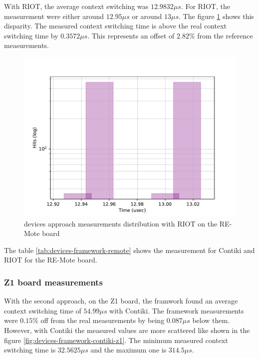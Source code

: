 With RIOT, the average context switching was $12.9832\mu s$.
For RIOT, the measurement were either around $12.95 \mu s$ or around $13 \mu s$.
The figure \ref{fig:devices-framework-riot-remote} shows this disparity.
The measured context switching time is above the real context switching time by $0.3572\mu s$.
This represents an offset of $2.82\%$ from the reference measurements.

\begin{figure}[!ht]
      \centering
      \includegraphics[scale=.7]{assets/devices-framework-riot-remote.pdf}
      \caption{devices approach measurements distribution with RIOT on the RE-Mote board\label{fig:devices-framework-riot-remote}}
\end{figure}

The table \ref{tab:devices-framework-remote} shows the measurement for Contiki and RIOT for the RE-Mote board.



\subsubsection{Z1 board measurements}
With the second approach, on the Z1 board, the framwork found an average context switching time of $54.99\mu s$ with Contiki.
The framework measurements were $0.15\%$ off from the real measurements by being $0.087\mu s$ below them.
However, with Contiki the measured values are more scattered like shown in the figure \ref{fig:devices-framework-contiki-z1}.
The minimum measured context switching time is $32.5625\mu s$ and the maximum one is $314.5\mu s$.

